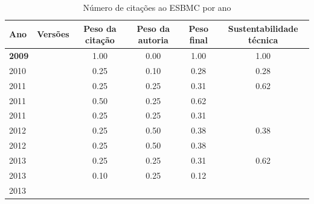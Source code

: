 \begin{table}[H]
\caption{Número de citações ao ESBMC  por ano}
\centering
\begin{tabular}{| l | c | c | c | c | c |}
  \hline
  Ano & Versões & Peso da citação & Peso da autoria & Peso final & Sustentabilidade técnica \\
  \hline
            {\bf 2009}
          &
          
          &
          1.00
          &
          0.00
          &
          1.00
          &
            {\color{blue} 1.00}
          \\
\hline
            2010
          &
          
          &
          0.25
          &
          0.10
          &
          0.28
          &
            {\color{red} 0.28}
          \\
\hline
            2011
          &
          
          &
          0.25
          &
          0.25
          &
          0.31
          &
            {\color{blue} 0.62}
          \\
            2011
          &
          
          &
          0.50
          &
          0.25
          &
          0.62
          &
          \\
            2011
          &
          
          &
          0.25
          &
          0.25
          &
          0.31
          &
          \\
\hline
            2012
          &
          
          &
          0.25
          &
          0.50
          &
          0.38
          &
            {\color{red} 0.38}
          \\
            2012
          &
          
          &
          0.25
          &
          0.50
          &
          0.38
          &
          \\
\hline
            2013
          &
          
          &
          0.25
          &
          0.25
          &
          0.31
          &
            {\color{blue} 0.62}
          \\
            2013
          &
          
          &
          0.10
          &
          0.25
          &
          0.12
          &
          \\
            2013
          &
          

\end{tabular}
\end{table}
